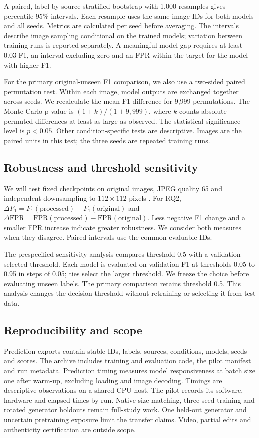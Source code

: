 A paired, label-by-source stratified bootstrap with 1,000 resamples gives percentile 95\% intervals. Each resample uses the same image IDs for both models and all seeds. Metrics are calculated per seed before averaging. The intervals describe image sampling conditional on the trained models; variation between training runs is reported separately. A meaningful model gap requires at least 0.03 F1, an interval excluding zero and an FPR within the target for the model with higher F1.

For the primary original-unseen F1 comparison, we also use a two-sided paired permutation test. Within each image, model outputs are exchanged together across seeds. We recalculate the mean F1 difference for 9,999 permutations. The Monte Carlo p-value is $(1+k)/(1+9,999)$, where $k$ counts absolute permuted differences at least as large as observed. The statistical significance level is $p<0.05$. Other condition-specific tests are descriptive. Images are the paired units in this test; the three seeds are repeated training runs.

\subsection{Robustness and threshold sensitivity}
We will test fixed checkpoints on original images, JPEG quality 65 and independent downsampling to $112\times112$ pixels \citep{wang2020,genimage2023}. For RQ2, $\Delta F_1=F_1(\mathrm{processed})-F_1(\mathrm{original})$ and $\Delta\mathrm{FPR}=\mathrm{FPR}(\mathrm{processed})-\mathrm{FPR}(\mathrm{original})$. Less negative F1 change and a smaller FPR increase indicate greater robustness. We consider both measures when they disagree. Paired intervals use the common evaluable IDs.

The prespecified sensitivity analysis compares threshold 0.5 with a validation-selected threshold. Each model is evaluated on validation F1 at thresholds 0.05 to 0.95 in steps of 0.05; ties select the larger threshold. We freeze the choice before evaluating unseen labels. The primary comparison retains threshold 0.5. This analysis changes the decision threshold without retraining or selecting it from test data.

\subsection{Reproducibility and scope}
Prediction exports contain stable IDs, labels, sources, conditions, models, seeds and scores. The archive includes training and evaluation code, the pilot manifest and run metadata. Prediction timing measures model responsiveness at batch size one after warm-up, excluding loading and image decoding. Timings are descriptive observations on a shared CPU host. The pilot records its software, hardware and elapsed times by run. Native-size matching, three-seed training and rotated generator holdouts remain full-study work. One held-out generator and uncertain pretraining exposure limit the transfer claims. Video, partial edits and authenticity certification are outside scope.
